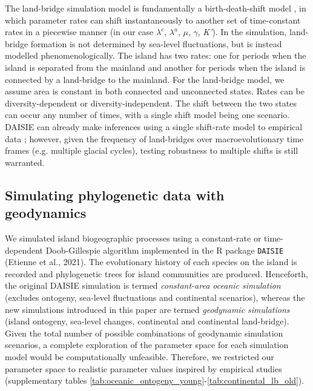 \documentclass{article}
\begin{document}
The land-bridge simulation model is fundamentally a birth-death-shift model \citep{rabosky_likelihood_2006, stadler_mammalian_2011, hohna_tess_2016}, in which parameter rates can shift instantaneously to another set of time-constant rates in a piecewise manner (in our case $\lambda^c$, $\lambda^a$, $\mu$, $\gamma$, \textit{K’}). In the simulation, land-bridge formation is not determined by sea-level fluctuations, but is instead modelled phenomenologically. The island has two rates: one for periods when the island is separated from the mainland and another for periods when the island is connected by a land-bridge to the mainland. For the land-bridge model, we assume area is constant in both connected and unconnected states. Rates can be diversity-dependent or diversity-independent. The shift between the two states can occur any number of times, with a single shift model \citep{valente_deep_2019, hauffe_lake_2020} being one scenario. DAISIE can already make inferences using a single shift-rate model to empirical data \citep{valente_deep_2019, hauffe_lake_2020}; however, given the frequency of land-bridges over macroevolutionary time frames (e.g. multiple glacial cycles), testing robustness to multiple shifts is still warranted. 

\subsection*{Simulating phylogenetic data with geodynamics}

We simulated island biogeographic processes using a constant-rate or time-dependent Doob-Gillespie algorithm \citep{gillespie_general_1976, allen_efficient_2009} implemented in the R package \texttt{DAISIE} (Etienne et al., 2021). The evolutionary history of each species on the island is recorded and phylogenetic trees for island communities are produced. Henceforth, the original DAISIE simulation \citep{valente_equilibrium_2015} is termed \textit{constant-area oceanic simulation} (excludes ontogeny, sea-level fluctuations and continental scenarios), whereas the new simulations introduced in this paper are termed \textit{geodynamic simulations} (island ontogeny, sea-level changes, continental and continental land-bridge). Given the total number of possible combinations of geodynamic simulation scenarios, a complete exploration of the parameter space for each simulation model would be computationally unfeasible. Therefore, we restricted our parameter space to realistic parameter values inspired by empirical studies (supplementary tables \ref{tab:oceanic_ontogeny_young}-\ref{tab:continental_lb_old}). \\
\end{document}
